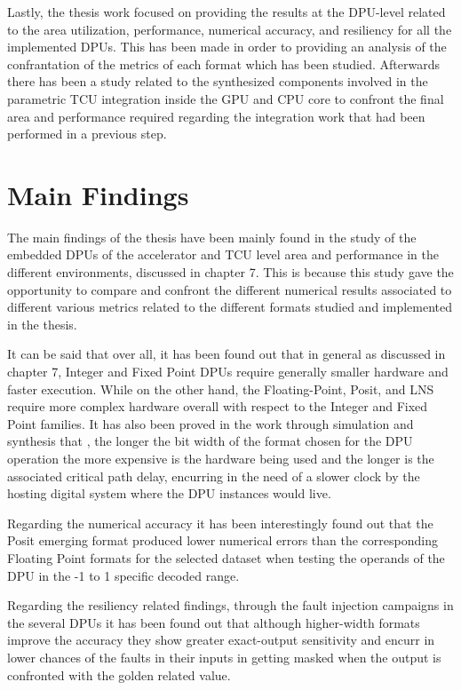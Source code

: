 Lastly, the thesis work focused on providing the results at the DPU-level related to the area utilization, performance, numerical accuracy, and resiliency for all the implemented DPUs. This has been made in order to providing an analysis of the confrantation of the metrics of each format which has been studied. Afterwards there has been a study related to the synthesized components involved in the parametric TCU integration inside the GPU and CPU core to confront the final area and performance required regarding the integration work that had been performed in a previous step.

\section{Main Findings}

The main findings of the thesis have been mainly found in the study of the embedded DPUs of the accelerator and TCU level area and performance in the different environments, discussed in chapter 7. This is because this study gave the opportunity to compare and confront the different numerical results associated to different various metrics related to the different formats studied and implemented in the thesis.

It can be said that over all, it has been found out that in general as discussed in chapter 7, Integer and Fixed Point DPUs require generally smaller hardware and faster execution. While on the other hand, the Floating-Point, Posit, and LNS require more complex hardware overall with respect to the Integer and Fixed Point families. It has also been proved in the work through simulation and synthesis that , the longer the bit width of the format chosen for the DPU operation the more expensive is the hardware being used and the longer is the associated critical path delay, encurring in the need of a slower clock by the hosting digital system where the DPU instances would live. 

Regarding the numerical accuracy it has been interestingly found out that the Posit emerging format produced lower numerical errors than the corresponding Floating Point formats for the selected dataset when testing the operands of the DPU in the -1 to 1 specific decoded range. 

Regarding the resiliency related findings, through the fault injection campaigns in the several DPUs it has been found out that although higher-width formats improve the accuracy they show greater exact-output sensitivity and encurr in lower chances of the faults in their inputs in getting masked when the output is confronted with the golden related value. 

